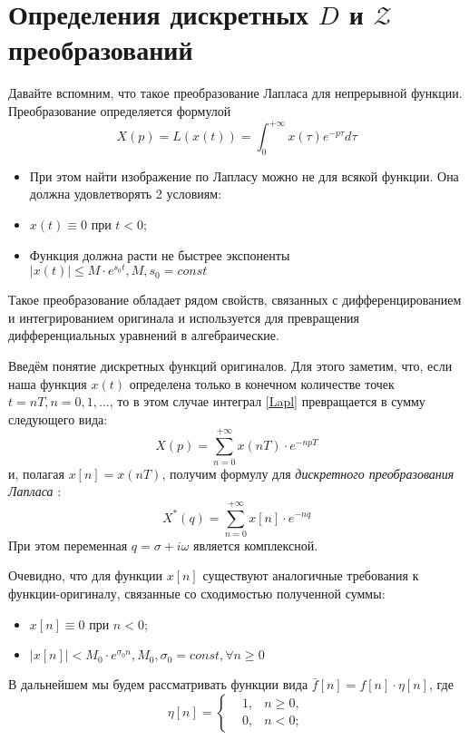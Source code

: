 \documentclass[12pt,twoside]{report}
\theoremstyle{MyNonumberplain}
\begin{document}
    \section{Определения дискретных $D$ и $\mathcal{Z}$ преобразований}
        Давайте вспомним, что такое преобразование Лапласа для непрерывной функции. Преобразование определяется формулой
        \begin{equation}\label{Lapl}
            X(p)=L(x(t))=\int_0^{+\infty} x(\tau) e^{-p\tau} d\tau
        \end{equation}
        \begin{itemize}
            \item При этом найти изображение по Лапласу можно не для всякой функции. Она должна удовлетворять 2 условиям:
            \item $x(t) \equiv 0$ при $t < 0$;
            \item Функция должна расти не быстрее экспоненты $|x(t)| \le M\cdot e^{s_0 t}, M,s_0=const$
        \end{itemize}

        Такое преобразование обладает рядом свойств, связанных с дифференцированием и интегрированием оригинала и используется
        для превращения дифференциальных уравнений в алгебраические.

        Введём понятие дискретных функций оригиналов. Для этого заметим, что, если наша функция $x(t)$ определена только в 
        конечном количестве точек $t=nT, n=0,1,\dots$, то в этом случае интеграл \eqref{Lapl} превращается в сумму следующего вида:
        \begin{equation*}
            X(p)=\sum_{n=0}^{+\infty} x(nT) \cdot e^{-npT}
        \end{equation*}
        и, полагая $x[n]=x(nT)$, получим формулу для \textit{дискретного преобразования Лапласа} :
        \begin{equation}\label{DiskrD}
            X^*(q)=\sum_{n=0}^{+\infty} x[n] \cdot e^{-nq}
        \end{equation}
        При этом переменная $q = \sigma + i\omega$ является комплексной.
    
        Очевидно, что для функции  $x[n]$ существуют аналогичные требования к функции-оригиналу, связанные со сходимостью
        полученной суммы:
        \begin{itemize}
            \item $x[n] \equiv 0$ при $n < 0$;
            \item $|x[n]| < M_0\cdot e^{\sigma_0 n}, M_0,\sigma_0=const, \forall n \ge 0$
        \end{itemize}
        В дальнейшем мы будем рассматривать функции вида $\bar{f}[n] = f[n]\cdot\eta[n]$, где
        \begin{equation*}
            \eta[n]=\left\{
            \begin{split}
                &1, &n \geq 0,\\
                &0, &n < 0;
            \end{split}
            \right.
        \end{equation*}
        
\end{document}
